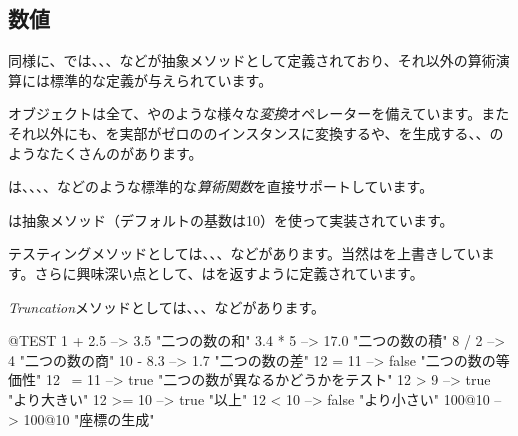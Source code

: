 \documentclass[a4paper,10pt,twoside]{book}
\begin{document}
\subsection{数値}

同様に、では、、、などが抽象メソッドとして定義されており、それ以外の算術演算には標準的な定義が与えられています。

オブジェクトは全て、やのような様々な\emph{変換}オペレーターを備えています。またそれ以外にも、を実部がゼロののインスタンスに変換するや、を生成する、、のようなたくさんのがあります。

は、、、、などのような標準的な\emph{算術関数}を直接サポートしています。

は抽象メソッド（デフォルトの基数は10）を使って実装されています。

テスティングメソッドとしては、、、などがあります。当然はを上書きしています。さらに興味深い点として、はを返すように定義されています。

\emph{Truncation}メソッドとしては、、、などがあります。

\begin{code}{@TEST}
1 + 2.5     --> 3.5             "二つの数の和"
3.4 * 5      --> 17.0           "二つの数の積"
8 / 2         --> 4                 "二つの数の商"
10 - 8.3   --> 1.7              "二つの数の差"
12 = 11    --> false           "二つの数の等価性"
12 ~= 11 --> true            "二つの数が異なるかどうかをテスト"
12 > 9      --> true            "より大きい"
12 >= 10  --> true            "以上"
12 < 10    --> false           "より小さい"
100@10   --> 100@10    "座標の生成"
\end{code}
\end{document}
